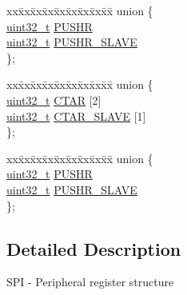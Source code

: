 \begin{DoxyCompactItemize}
\begin{tabbing}
\end{tabbing}\item 
\begin{tabbing}
xx\=xx\=xx\=xx\=xx\=xx\=xx\=xx\=xx\=\kill
union \{\\
\>\hyperlink{_p_e___types_8h_a33594304e786b158f3fb30289278f5af}{uint32\_t} \hyperlink{struct_s_p_i___mem_map_a9b91ea535dc969f210119d1cad2a246e}{PUSHR}\\
\>\hyperlink{_p_e___types_8h_a33594304e786b158f3fb30289278f5af}{uint32\_t} \hyperlink{struct_s_p_i___mem_map_a22553d476505bf3416a55f681a70774e}{PUSHR\_SLAVE}\\
\}; \\

\end{tabbing}\item 
\begin{tabbing}
xx\=xx\=xx\=xx\=xx\=xx\=xx\=xx\=xx\=\kill
union \{\\
\>\hyperlink{_p_e___types_8h_a33594304e786b158f3fb30289278f5af}{uint32\_t} \hyperlink{struct_s_p_i___mem_map_afe52c1ebf9e5971e43fdfea50cf16a48}{CTAR} \mbox{[}2\mbox{]}\\
\>\hyperlink{_p_e___types_8h_a33594304e786b158f3fb30289278f5af}{uint32\_t} \hyperlink{struct_s_p_i___mem_map_a4824e400ced2bf2bd5c89e95e7ef55d6}{CTAR\_SLAVE} \mbox{[}1\mbox{]}\\
\}; \\

\end{tabbing}\item 
\begin{tabbing}
xx\=xx\=xx\=xx\=xx\=xx\=xx\=xx\=xx\=\kill
union \{\\
\>\hyperlink{_p_e___types_8h_a33594304e786b158f3fb30289278f5af}{uint32\_t} \hyperlink{struct_s_p_i___mem_map_a9b91ea535dc969f210119d1cad2a246e}{PUSHR}\\
\>\hyperlink{_p_e___types_8h_a33594304e786b158f3fb30289278f5af}{uint32\_t} \hyperlink{struct_s_p_i___mem_map_a22553d476505bf3416a55f681a70774e}{PUSHR\_SLAVE}\\
\}; \\

\end{tabbing}\end{DoxyCompactItemize}


\subsection{Detailed Description}
S\+PI -\/ Peripheral register structure 

